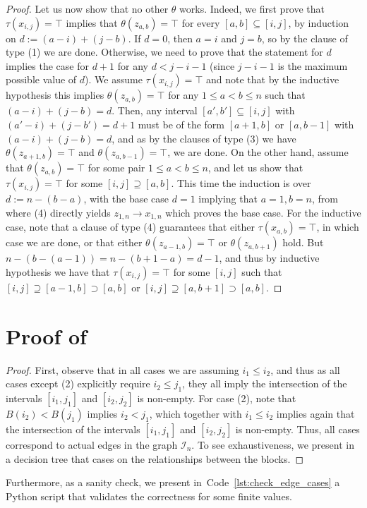 \documentclass[11pt]{article}
\begin{document}
\begin{proof}
    Let us now show that no other $\theta$ works. Indeed, we first prove that $\tau(x_{i, j}) = \top$ implies that \( \theta(z_{a, b}) = \top \) for every $[a, b] \subseteq [i, j]$, by induction on $d := (a-i) + (j-b)$. If $d = 0$, then $a = i$ and $j = b$, so by the clause of type (1) we are done.
     Otherwise, we need to prove that the statement for $d$ implies the case for $d+1$ for any $d < j - i - 1$ (since $j-i-1$ is the maximum possible value of $d$).
     We assume $\tau(x_{i, j}) = \top$ and note that by the inductive hypothesis this implies $\theta(z_{a, b}) = \top$ for any $1 \leq a < b \leq n$ such that $(a-i) + (j-b) = d$. Then, any interval $[a', b'] \subseteq [i, j]$ with $(a'-i) + (j-b') = d+1$ must be of the form $[a+1, b]$ or $[a, b-1]$ with $(a-i) + (j-b) = d$, and as by the clauses of type (3) we have $\theta(z_{a+1, b}) = \top$ and $\theta(z_{a, b-1}) = \top$, we are done.
     On the other hand, assume that \( \theta(z_{a, b}) = \top \) for some pair $1 \leq a < b \leq n$, and let us show that $\tau(x_{i, j}) = \top$ for some $[i, j]\supseteq [a, b]$.
     This time the induction is over $d := n - (b-a)$, with the base case $d = 1$ implying that $a=1, b = n$, from where (4) directly yields $z_{1, n} \to x_{1, n}$ which proves the base case. For the inductive case,
     note that a clause of type (4) guarantees that either $\tau(x_{a, b}) = \top$, in which case we are done, or that
      either $\theta(z_{a-1, b}) = \top$ or $\theta(z_{a, b+1})$ hold. But $n - (b - (a-1)) = n - (b+1 - a) = d-1$, and thus by inductive hypothesis we have that $\tau(x_{i, j}) = \top$ for some $[i, j]$ such that $[i, j] \supseteq [a-1, b] \supset [a, b]$ or $[i, j] \supseteq [a, b+1] \supset [a, b]$.
\end{proof}

\section{Proof of~\texorpdfstring{}{Lemma 20}}\label{app:code}

\edgecases*
\begin{proof}
First, observe that in all cases we are assuming $i_1 \leq i_2$, and thus as all cases except (2) explicitly require $i_2 \leq j_1$, they all imply the intersection of the intervals $[i_1, j_1]$ and $[i_2, j_2]$ is non-empty.
For case (2), note that $B(i_2) < B(j_1)$ implies $i_2 < j_1$, which together with $i_1 \leq i_2$ implies again that the intersection of the intervals $[i_1, j_1]$ and $[i_2, j_2]$ is non-empty.
Thus, all cases correspond to actual edges in the graph $\mathcal{I}_n$. 
To see exhaustiveness, we present in~ a decision tree that cases on the relationships between the blocks.
\end{proof}
Furthermore, as a sanity check, we present in~Code~\ref{lst:check_edge_cases} a Python script that validates the correctness for some finite values.
\end{document}

